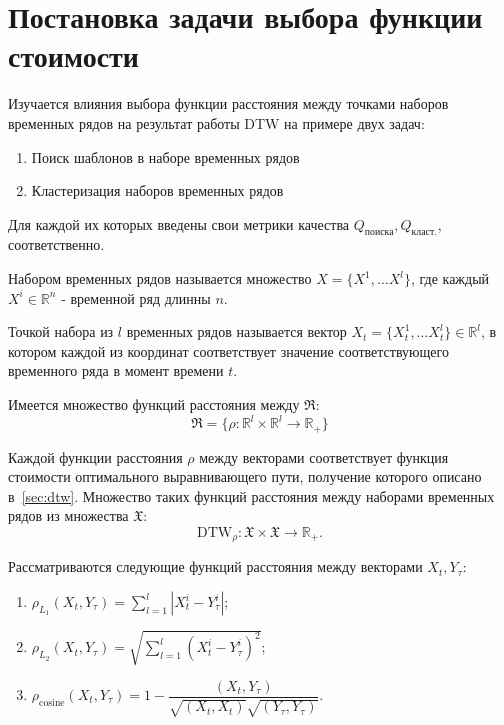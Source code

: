 \documentclass[12pt,twoside]{article}
\begin{document}
    \section{Постановка задачи выбора функции стоимости}\label{sec:problem}
	    Изучается влияния выбора функции расстояния между точками наборов временных рядов на результат работы DTW на примере двух задач:
        \begin{enumerate}[label=\arabic*)]
            \item Поиск шаблонов в наборе временных рядов
            \item Кластеризация наборов временных рядов
        \end{enumerate} 
        Для каждой их которых введены свои метрики качества $Q_\text{поиска}, Q_\text{класт.}$,  соответственно.
	    
	    \begin{Def}{}  
	        Набором временных рядов называется множество $X = \{X^1,\dots X^l\}$, где каждый $X^i \in \mathbb{R}^{n}$ \-- временной ряд длинны $n$.
	    \end{Def}
	    \begin{Def}{}  
	        Точкой набора из $l$ временных рядов называется вектор $X_t = \{X^1_t,\dots X^l_t\} \in \mathbb{R}^l$, в котором каждой из координат соответствует значение соответствующего временного ряда в момент времени $t$.
	    \end{Def}
	    
        Имеется множество функций расстояния между $\mathfrak{R}$:
            $$\mathfrak{R} = \{\rho: \mathbb{R}^l \times \mathbb{R}^l \rightarrow \mathbb{R}_+ \}$$

        Каждой функции расстояния $\rho$ между векторами соответствует функция стоимости оптимального выравнивающего пути, получение которого описано в~\ref{sec:dtw}. Множество таких функций расстояния между наборами временных рядов из множества $\mathfrak{X}$: 
        $$\text{DTW}_{\rho}: \mathfrak{X} \times \mathfrak{X} \rightarrow \mathbb{R}_+.$$
        
        Рассматриваются следующие функций расстояния между векторами $X_t, Y_\tau$:         
        \begin{enumerate}[label=\arabic*)]
            \item $\rho_{L_1}(X_t, Y_\tau) = {\displaystyle\sum_{l = 1}^{l} |X^i_t - Y^i_\tau|}$;
            \item $\rho_{L_2}(X_t, Y_\tau) = \sqrt{\displaystyle\sum_{l = 1}^{l} (X^i_t - Y^i_\tau)^2}$;
            \item $\rho_\text{cosine}(X_t, Y_\tau) = 1 - \dfrac{(X_t, Y_\tau)}{\sqrt{(X_t, X_t)}\sqrt{(Y_\tau, Y_\tau)}}$.
        \end{enumerate}
        
\end{document}
